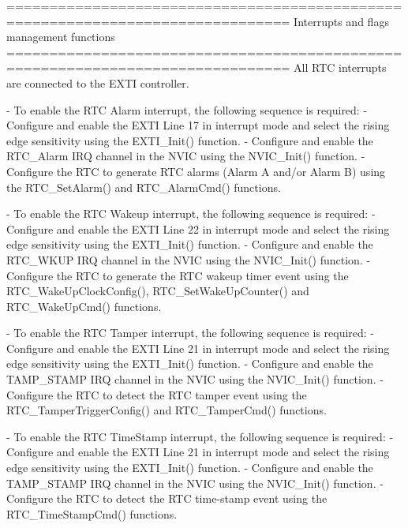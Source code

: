 \begin{DoxyVerb} ===============================================================================
                       Interrupts and flags management functions
 ===============================================================================  
 All RTC interrupts are connected to the EXTI controller.
 
 - To enable the RTC Alarm interrupt, the following sequence is required:
   - Configure and enable the EXTI Line 17 in interrupt mode and select the rising 
     edge sensitivity using the EXTI_Init() function.
   - Configure and enable the RTC_Alarm IRQ channel in the NVIC using the NVIC_Init()
     function.
   - Configure the RTC to generate RTC alarms (Alarm A and/or Alarm B) using
     the RTC_SetAlarm() and RTC_AlarmCmd() functions.

 - To enable the RTC Wakeup interrupt, the following sequence is required:
   - Configure and enable the EXTI Line 22 in interrupt mode and select the rising 
     edge sensitivity using the EXTI_Init() function.
   - Configure and enable the RTC_WKUP IRQ channel in the NVIC using the NVIC_Init()
     function.
   - Configure the RTC to generate the RTC wakeup timer event using the 
     RTC_WakeUpClockConfig(), RTC_SetWakeUpCounter() and RTC_WakeUpCmd() functions.

 - To enable the RTC Tamper interrupt, the following sequence is required:
   - Configure and enable the EXTI Line 21 in interrupt mode and select the rising 
     edge sensitivity using the EXTI_Init() function.
   - Configure and enable the TAMP_STAMP IRQ channel in the NVIC using the NVIC_Init()
     function.
   - Configure the RTC to detect the RTC tamper event using the 
     RTC_TamperTriggerConfig() and RTC_TamperCmd() functions.

 - To enable the RTC TimeStamp interrupt, the following sequence is required:
   - Configure and enable the EXTI Line 21 in interrupt mode and select the rising 
     edge sensitivity using the EXTI_Init() function.
   - Configure and enable the TAMP_STAMP IRQ channel in the NVIC using the NVIC_Init()
     function.
   - Configure the RTC to detect the RTC time-stamp event using the 
     RTC_TimeStampCmd() functions.\end{DoxyVerb}
 

